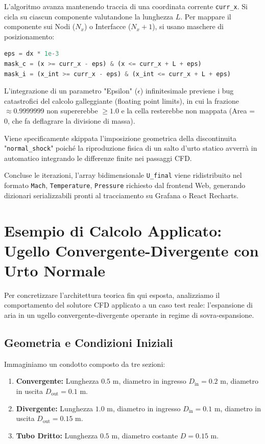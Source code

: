 \documentclass[11pt,a4paper]{article}
\begin{document}
L'algoritmo avanza mantenendo traccia di una coordinata corrente \texttt{curr\_x}. Si cicla su ciascun componente valutandone la lunghezza $L$.
Per mappare il componente sui Nodi ($N_x$) o Interfacce ($N_x + 1$), si usano maschere di posizionamento:
\begin{lstlisting}[language=Python]
eps = dx * 1e-3
mask_c = (x >= curr_x - eps) & (x <= curr_x + L + eps)
mask_i = (x_int >= curr_x - eps) & (x_int <= curr_x + L + eps)
\end{lstlisting}
L'integrazione di un parametro "Epsilon" ($\epsilon$) infinitesimale previene i bug catastrofici del calcolo galleggiante (floating point limits), in cui la frazione $\approx 0.9999999$ non supererebbe $\geq 1.0$ e la cella resterebbe non mappata (Area = 0, che fa deflagrare la divisione di massa).

Viene specificamente skippata l'imposizione geometrica della discontinuita "\texttt{normal\_shock}" poiché la riproduzione fisica di un salto d'urto statico avverrà in automatico integrando le differenze finite nei passaggi CFD.

Concluse le iterazioni, l'array bidimensionale \texttt{U\_final} viene ridistribuito nel formato \texttt{Mach}, \texttt{Temperature}, \texttt{Pressure} richiesto dal frontend Web, generando dizionari serializzabili pronti al tracciamento su Grafana o React Recharts.

\section{Esempio di Calcolo Applicato: Ugello Convergente-Divergente con Urto Normale}

Per concretizzare l'architettura teorica fin qui esposta, analizziamo il comportamento del solutore CFD applicato a un caso test reale: l'espansione di aria in un ugello convergente-divergente operante in regime di sovra-espansione. 

\subsection{Geometria e Condizioni Iniziali}
Immaginiamo un condotto composto da tre sezioni:
\begin{enumerate}
    \item \textbf{Convergente:} Lunghezza $0.5$ m, diametro in ingresso $D_{\text{in}} = 0.2$ m, diametro in uscita $D_{\text{out}} = 0.1$ m.
    \item \textbf{Divergente:} Lunghezza $1.0$ m, diametro in ingresso $D_{\text{in}} = 0.1$ m, diametro in uscita $D_{\text{out}} = 0.15$ m.
    \item \textbf{Tubo Dritto:} Lunghezza $0.5$ m, diametro costante $D = 0.15$ m.
\end{enumerate}
\end{document}
